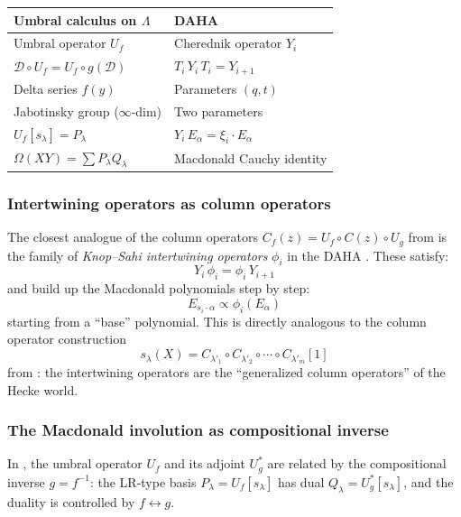 \documentclass[11pt]{amsart}
\theoremstyle{definition}
\newcommand{\cD}{\mathcal{D}}
\begin{document}
\medskip
\begin{center}
\renewcommand{\arraystretch}{1.3}
\begin{tabular}{>{\raggedright}p{5.5cm}
  >{\raggedright\arraybackslash}p{5.5cm}}
\toprule
\textbf{Umbral calculus on $\Lambda$} &
\textbf{DAHA} \\
\midrule
Umbral operator $U_f$ &
Cherednik operator $Y_i$ \\[3pt]
$\cD \circ U_f = U_f \circ g(\cD)$ &
$T_i\, Y_i\, T_i = Y_{i+1}$ \\[3pt]
Delta series $f(y)$ &
Parameters $(q, t)$ \\[3pt]
Jabotinsky group ($\infty$-dim) &
Two parameters \\[3pt]
$U_f[s_\lambda] = P_\lambda$ &
$Y_i\, E_\alpha = \xi_i \cdot E_\alpha$ \\[3pt]
$\Omega(XY) = \sum P_\lambda Q_\lambda$ &
Macdonald Cauchy identity \\
\bottomrule
\end{tabular}
\end{center}

\subsubsection{Intertwining operators as column operators}

The closest analogue of the column operators
$C_f(z) = U_f \circ C(z) \circ U_g$ from \cite{Langer} is the
family of \emph{Knop--Sahi intertwining operators} $\phi_i$ in the
DAHA \cite{Knop,Sahi}. These satisfy:
\begin{equation}\label{eq:intertwine}
  Y_i\, \phi_i = \phi_i\, Y_{i+1}
\end{equation}
and build up the Macdonald polynomials step by step:
\[
  E_{s_i \cdot \alpha} \propto \phi_i(E_\alpha)
\]
starting from a ``base'' polynomial. This is directly analogous to
the column operator construction
\[
  s_\lambda(X) = C_{\lambda'_1} \circ C_{\lambda'_2} \circ \cdots
  \circ C_{\lambda'_m}[1]
\]
from \cite[Prop.~1.4]{Langer}: the intertwining operators are the
``generalized column operators'' of the Hecke world.

\subsubsection{The Macdonald involution as compositional inverse}

In \cite{Langer}, the umbral operator $U_f$ and its adjoint
$U_g^*$ are related by the compositional inverse $g = f^{-1}$:
the LR-type basis $P_\lambda = U_f[s_\lambda]$ has dual
$Q_\lambda = U_g^*[s_\lambda]$, and the duality is controlled by
$f \leftrightarrow g$.
\end{document}
